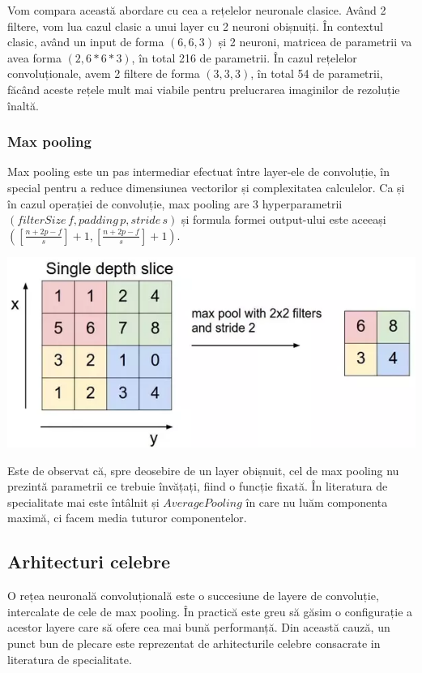 Vom compara această abordare cu cea a rețelelor neuronale clasice. Având 2 filtere, vom lua cazul clasic a unui layer cu 2 neuroni obișnuiți. În contextul clasic, având un input de forma $(6,6,3)$ și 2 neuroni, matricea de parametrii va avea forma $(2,6*6*3)$, în total 216 de parametrii. În cazul rețelelor convoluționale, avem 2 filtere de forma $(3,3,3)$, în total 54 de parametrii, făcând aceste rețele mult mai viabile pentru prelucrarea imaginilor de rezoluție înaltă.

\subsubsection{Max pooling}
Max pooling este un pas intermediar efectuat între layer-ele de convoluție, în special pentru a reduce dimensiunea vectorilor și complexitatea calculelor. Ca și în cazul operației de convoluție, max pooling are 3 hyperparametrii $(filterSize \, f, padding \, p ,stride \, s)$ și formula formei output-ului este aceeași $\displaystyle{\left(\displaystyle{\left[\frac{n+2p-f}{s}\right]}+1, \displaystyle{\left[\frac{n+2p-f}{s}\right]}+1\right)}$.
 
\begin{center}
\includegraphics[scale=0.5]{maxPooling}
\end{center}

Este de observat că, spre deosebire de un layer obișnuit, cel de max pooling nu prezintă parametrii ce trebuie învățați, fiind o funcție fixată. În literatura de specialitate mai este întâlnit și $Average Pooling$ în care nu luăm componenta maximă, ci facem media tuturor componentelor.

\subsection{Arhitecturi celebre}
O rețea neuronală convoluțională este o succesiune de layere de convoluție, intercalate de cele de max pooling. În practică este greu să găsim o configurație a acestor layere care să ofere cea mai bună performanță. Din această cauză, un punct bun de plecare este reprezentat de arhitecturile celebre consacrate in literatura de specialitate.

